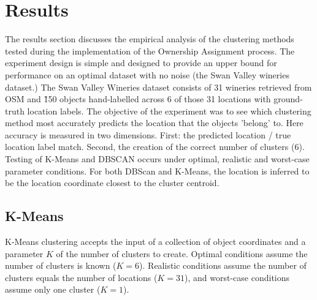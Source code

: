 \section{Results}
\label{section:results}

The results section discusses the empirical analysis of the clustering methods tested during the implementation of the Ownership Assignment process. 
The experiment design is simple and designed to provide an upper bound for performance on an optimal dataset with no noise (the Swan Valley wineries dataset.) 
The Swan Valley Wineries dataset consists of 31 wineries retrieved from OSM and \~150 objects hand-labelled across 6 of those 31 locations with ground-truth location labels. 
The objective of the experiment was to see which clustering method most accurately predicts the location that the objects 'belong' to. Here accuracy is measured in two dimensions. 
First: the predicted location / true location label match. Second, the creation of the correct number of clusters (6).
Testing of K-Means and DBSCAN occurs under optimal, realistic and worst-case parameter conditions. For both DBScan and K-Means, the location is inferred to be the location coordinate closest to the cluster centroid. 

\subsection{K-Means}
K-Means clustering accepts the input of a collection of object coordinates and a parameter $K$ of the number of clusters to create. 
Optimal conditions assume the number of clusters is known ($K=6$). 
Realistic conditions assume the number of clusters equals the number of locations ($K=31$), and worst-case conditions assume only one cluster ($K=1$). 

